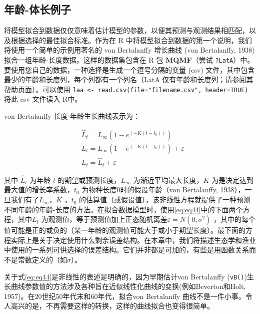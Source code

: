 \documentclass[
  lang=cn,
  11pt,
  scheme=chinese,
  chinesefont=nofont,
  citestyle=gb7714-2015,
  bibstyle=gb7714-2015]{elegantbook}
\begin{document}
\subsection{年龄-体长例子}\label{ux5e74ux9f84-ux4f53ux957fux4f8bux5b50}

将模型拟合到数据仅仅意味着估计模型的参数，以便其预测与观测结果相匹配，以及根据选择的最佳拟合标准。作为在 R 中将模型拟合到数据的第一个说明，我们将使用一个简单的示例用著名的 von Bertalanffy 增长曲线 (von Bertalanffy, 1938) 拟合一组年龄-长度数据。这样的数据集包含在 R 包 \textbf{MQMF}（尝试 \texttt{?LatA}）中。要使用您自己的数据，一种选择是生成一个逗号分隔的变量 (csv) 文件，其中包含最少的年龄和长度列，每个列都有一个列名（LatA 仅有年龄和长度列；请参阅其帮助页面）。可以使用 \texttt{laa\ \textless{}-\ read.csv(file="filename.csv",\ header=TRUE)} 将此 csv 文件读入 R中。

von Bertalanffy 长度-年龄生长曲线表示为：

\begin{equation}  
\begin{split}    
& {{\hat{L}}_t}={L_{\infty}}\left( 1-{e^{\left( -K\left( t-{t_0} \right) \right)}} \right) \\    
& {L_t}={L_{\infty}}\left( 1-{e^{\left( -K\left( t-{t_0} \right) \right)}} \right)+\varepsilon  \\    
& {L_t}= {\hat{L}}_t + \varepsilon    
\end{split}   
\label{eq:eq44}   
\end{equation}

其中 \(\hat L_t\) 为年龄 \(t\) 的期望或预测长度，\(L_{\infty}\) 为渐近平均最大长度，\(K\) 为是决定达到最大值的增长率系数，\(t_0\) 为物种长度0时的假设年龄（von Bertalanffy, 1938），一旦我们有了\(L_{\infty}\)，\(K\) ，\(t_0\) 的估算值（或假设值），该非线性方程就提供了一种预测不同年龄的年龄-长度的方法。在拟合数据模型时，使用\eqref{eq:eq44}中的下面两个方程，其中\(L_t\) 为观测值，等于预测值加上正态随机离差\(\varepsilon = N(0, \sigma^2)\) ，其中的每个值可能是正的或负的（某一年龄的观测值可能大于或小于期望长度）。最下面的方程实际上是关于决定使用什么剩余误差结构。在本章中，我们将描述生态学和渔业中使用的一系列可供选择的误差结构。它们并非都是可加的，有些是用函数关系而不是常数定义的（如\(\sigma\)）。

关于式\eqref{eq:eq44}是非线性的表述是明确的，因为早期估计von Bertalanffy (\texttt{vB()})生长曲线参数值的方法涉及各种旨在近似线性化曲线的变换(例如Beverton和Holt, 1957)。在20世纪50年代末和60年代，拟合von Bertalanffy 曲线不是一件小事。令人高兴的是，不再需要这样的转换，这样的曲线拟合也变得很简单。
\end{document}
